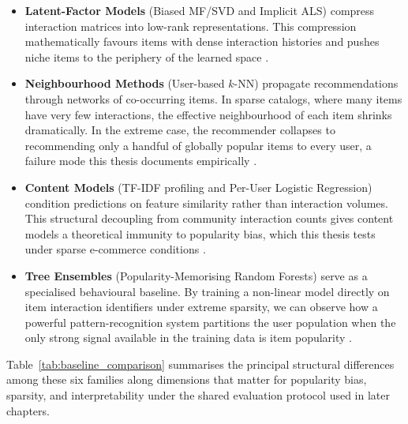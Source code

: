 \documentclass[11pt,a4paper]{report}
\begin{document}
\begin{itemize}
    \item \textbf{Latent-Factor Models} (Biased MF/SVD and Implicit ALS) compress interaction matrices into low-rank representations. This compression mathematically favours items with dense interaction histories and pushes niche items to the periphery of the learned space \citep{koren2009matrix, hu2008collaborative}.

    \item \textbf{Neighbourhood Methods} (User-based $k$-NN) propagate recommendations through networks of co-occurring items. In sparse catalogs, where many items have very few interactions, the effective neighbourhood of each item shrinks dramatically. In the extreme case, the recommender collapses to recommending only a handful of globally popular items to every user, a failure mode this thesis documents empirically \citep{sarwar2001item}.

    \item \textbf{Content Models} (TF-IDF profiling and Per-User Logistic Regression) condition predictions on feature similarity rather than interaction volumes. This structural decoupling from community interaction counts gives content models a theoretical immunity to popularity bias, which this thesis tests under sparse e-commerce conditions \citep{lops2011contentbased}.

    \item \textbf{Tree Ensembles} (Popularity-Memorising Random Forests) serve as a specialised behavioural baseline. By training a non-linear model directly on item interaction identifiers under extreme sparsity, we can observe how a powerful pattern-recognition system partitions the user population when the only strong signal available in the training data is item popularity \citep{breiman2001random}.
\end{itemize}

Table~\ref{tab:baseline_comparison} summarises the principal structural differences among these six families along dimensions that matter for popularity bias, sparsity, and interpretability under the shared evaluation protocol used in later chapters.
\end{document}
